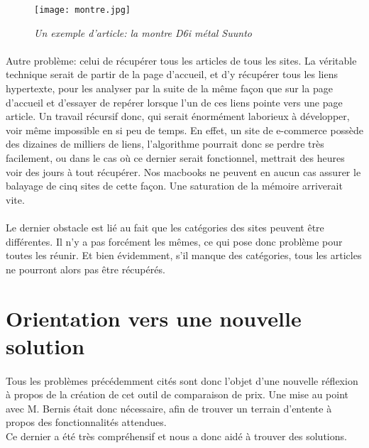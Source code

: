 \documentclass{report}
\begin{document}
\begin{figure}[H]
\begin{center}
\texttt{[image: montre.jpg]}
\caption{\textit{Un exemple d'article: la montre D6i métal Suunto}}
\end{center}
\end{figure}


\paragraph{}
Autre problème: celui de récupérer tous les articles de tous les sites. La véritable technique serait de partir de la page d'accueil, et d'y récupérer tous les liens hypertexte, pour les analyser par la suite de la même façon que sur la page d'accueil et d'essayer de repérer lorsque l'un de ces liens pointe vers une page article. Un travail récursif donc, qui serait énormément laborieux à développer, voir même impossible en si peu de temps. En effet, un site de e-commerce possède des dizaines de milliers de liens, l'algorithme pourrait donc se perdre très facilement, ou dans le cas où ce dernier serait fonctionnel, mettrait des heures voir des jours à tout récupérer. Nos macbooks ne peuvent en aucun cas assurer le balayage de cinq sites de cette façon. Une saturation de la mémoire arriverait vite.

\paragraph{}
Le dernier obstacle est lié au fait que les catégories des sites peuvent être différentes. Il n'y a pas forcément les mêmes, ce qui pose donc problème pour toutes les réunir. Et bien évidemment, s'il manque des catégories, tous les articles ne pourront alors pas être récupérés.


\section{Orientation vers une nouvelle solution}

\paragraph{}
Tous les problèmes précédemment cités sont donc l'objet d'une nouvelle réflexion à propos de la création de cet outil de comparaison de prix. Une mise au point avec M. Bernis était donc nécessaire, afin de trouver un terrain d'entente à propos des fonctionnalités attendues.\\
Ce dernier a été très compréhensif et nous a donc aidé à trouver des solutions.
\end{document}
